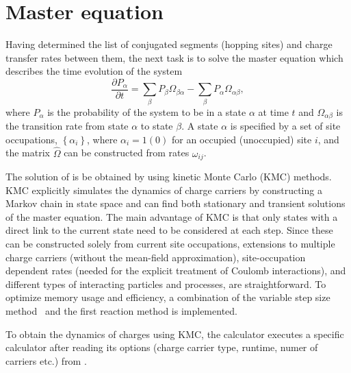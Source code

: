 \section{Master equation} \label{sec:kmc}
Having determined the list of conjugated segments (hopping sites) and charge 
transfer rates between them, the next task is to solve the master equation which 
describes the time evolution of the system
%
\begin{equation}
\label{equ:master}
\frac{\partial P_\alpha}{\partial t} = \sum_{\beta} P_\beta \Omega_{\beta 
\alpha} - 
\sum_{\beta} P_\alpha \Omega_{\alpha \beta},
\end{equation}
%
where $P_\alpha$ is the probability of the system to be in a state $\alpha$ at 
time $t$ and $\Omega_{\alpha \beta}$ is the transition rate from state $\alpha$ 
to state $\beta$. A state $\alpha$ is specified by a set of site occupations, 
$\left\{ \alpha_i \right\}$, where $\alpha_i = 1 (0)$ for an occupied 
(unoccupied) site $i$, and the matrix $\hat{\Omega}$ can be constructed from 
rates $\omega_{ij}$.

The solution of  is be obtained by using kinetic Monte Carlo (KMC) 
methods. KMC explicitly simulates the dynamics of charge carriers by 
constructing a Markov chain in state space and can find both stationary and 
transient solutions of the master equation. The main advantage of KMC is that 
only states with a direct link to the current state need to be considered at 
each step. Since these can be constructed solely from current site occupations, 
extensions to multiple charge carriers (without the mean-field approximation), 
site-occupation dependent rates (needed for the explicit treatment of Coulomb 
interactions), and different types of interacting particles and processes, are 
straightforward. To optimize memory usage and efficiency, a combination of the 
variable step size method~\cite{bortz_new_1975} and the first reaction method is 
implemented.

To obtain the dynamics of charges using KMC, the calculator \xtprun executes a 
specific calculator after reading its options (charge carrier type, runtime, 
numer of carriers etc.) from \xmloptions. 

